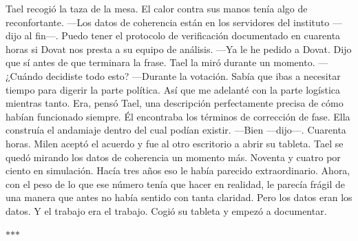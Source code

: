 \documentclass[11pt,a5paper,twoside]{book}
\begin{document}
Tael recogió la taza de la mesa. El calor contra sus manos tenía algo de reconfortante.
—Los datos de coherencia están en los servidores del instituto —dijo al fin—. Puedo tener el protocolo de verificación documentado en cuarenta horas si Dovat nos presta a su equipo de análisis.
—Ya le he pedido a Dovat. Dijo que sí antes de que terminara la frase.
Tael la miró durante un momento.
—¿Cuándo decidiste todo esto?
—Durante la votación. Sabía que ibas a necesitar tiempo para digerir la parte política. Así que me adelanté con la parte logística mientras tanto.
Era, pensó Tael, una descripción perfectamente precisa de cómo habían funcionado siempre. Él encontraba los términos de corrección de fase. Ella construía el andamiaje dentro del cual podían existir.
—Bien —dijo—. Cuarenta horas.
Milen aceptó el acuerdo y fue al otro escritorio a abrir su tableta.
Tael se quedó mirando los datos de coherencia un momento más. Noventa y cuatro por ciento en simulación. Hacía tres años eso le había parecido extraordinario. Ahora, con el peso de lo que ese número tenía que hacer en realidad, le parecía frágil de una manera que antes no había sentido con tanta claridad.
Pero los datos eran los datos. Y el trabajo era el trabajo.
Cogió su tableta y empezó a documentar.

\vspace{1.5em}
\begin{center}$\ast$\quad$\ast$\quad$\ast$\end{center}
\vspace{1.5em}
\end{document}
